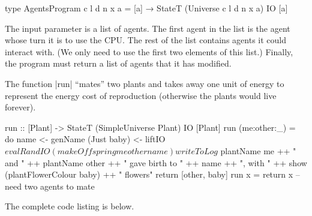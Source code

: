 \begin{code}
type AgentsProgram c l d n x a = 
  [a] → StateT (Universe c l d n x a) IO [a]
\end{code} 

The input parameter is a list of agents. 
The first agent in the list is the agent whose turn it is to use the 
CPU.
The rest of the list contains agents it could interact with.
(We only need to use the first two elements of this list.)
Finally, the program must return a list of agents that it has modified.

The function |run| ``mates'' two plants and takes away one unit of energy 
to represent the energy cost of reproduction
(otherwise the plants would live forever).

\begin{code}
run :: [Plant] -> StateT (SimpleUniverse Plant) IO [Plant]
run (me:other:_) = do
  name <- genName
  (Just baby) <- liftIO $ evalRandIO (makeOffspring me other name)
  writeToLog $ 
    plantName me ++ " and " ++ plantName other ++
      " gave birth to " ++ name ++ ", with " ++ 
       show (plantFlowerColour baby) ++ " flowers"
  return [other, baby]
run x = return x -- need two agents to mate
\end{code}

The complete code listing is below.
\label{code:plant}

